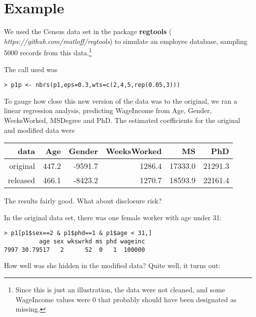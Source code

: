 \documentclass[11pt]{article}
\begin{document}
\section{Example}

We used the Census data set in the package {\bf regtools} ({\it
https://github.com/matloff/regtools}) to simulate an employee
database, sampling 5000 records from this data.\footnote{Since this is
just an illustration, the data were not cleaned, and some WageIncome
values were 0 that probably should have been designated as missing.}

The call used was

\begin{lstlisting}
> p1p <- nbrs(p1,eps=0.3,wts=c(2,4,5,rep(0.05,3)))
\end{lstlisting}

To gauge how close this new version of the data was to the original, we 
ran a linear regression analysis, predicting WageIncome from Age,
Gender, WeeksWorked, MSDegree and PhD.  
The estimated coefficients
for the original and modified data were

\begin{tabular}{|r|r|r|r|r|r|}
\hline
data & Age & Gender & WeeksWorked & MS & PhD \\ \hline 
original & 447.2 & -9591.7 & 1286.4 & 17333.0 & 21291.3 \\ \hline 
released & 466.1 & -8423.2 & 1270.7 & 18593.9 & 22161.4 \\ \hline 
\end{tabular}

The results fairly good.  What about disclosure risk?

In the original data set, there was one female worker with age under 31:

\begin{lstlisting}
> p1[p1$sex==2 & p1$phd==1 & p1$age < 31,]
          age sex wkswrkd ms phd wageinc
7997 30.79517   2      52  0   1  100000
\end{lstlisting}

How well was she hidden in the modified data?  Quite well, it turns out:
\end{document}
